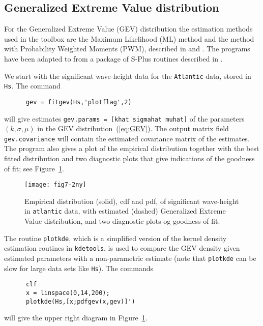 \subsection{Generalized Extreme Value distribution}

For the Generalized Extreme Value (GEV) distribution the estimation
methods used in the \progname{} toolbox are
the Maximum Likelihood (ML) method and the
method with Probability
Weighted Moments (PWM),
described in \cite{PrescottAndWalden1980Maximum} and
\cite{HoskingEtal1985Estimation}. The
programs have been adapted to \ML{} from a package of S-Plus routines
described in \cite{Borg1992XS}.

We start with the significant wave-height data for the \verb+Atlantic+ data,
stored in {\tt Hs}. The command
{\small\begin{verbatim}
      gev = fitgev(Hs,'plotflag',2)
\end{verbatim}}
\noindent
will give estimates {\tt gev.params = [khat sigmahat muhat]}
of the parameters $(k, {\sigma}, {\mu})$
in the GEV distribution~(\ref{eq:GEV}).
The output matrix field {\tt gev.covariance} will contain the
estimated covariance matrix of the estimates. The program also gives
a plot of the empirical distribution together with the
best fitted distribution and two diagnostic plots that give indications
of the goodness of fit; see Figure~\ref{fig7-2}.

 \begin{figure}
\centerline{
  \texttt{[image: fig7-2ny]}
}
\vspace{-3mm}
  \caption[Observed and estimated distribution
of significant wave-height]{
Empirical distribution (solid), cdf and pdf,
of significant wave-height in {\tt atlantic} data, with estimated (dashed)
  Generalized Extreme Value distribution, and two diagnostic plots og
goodness of fit.}
  \label{fig7-2}
\end{figure}

The routine 
{\tt plotkde}, which is a simplified version of the kernel density
estimation routines in {\tt kdetools}, is used to compare the GEV
density given estimated parameters with a non-parametric estimate
(note that {\tt plotkde} can be slow for large data sets like
{\tt Hs}).
The commands
{\small\begin{verbatim}
      clf
      x = linspace(0,14,200);
      plotkde(Hs,[x;pdfgev(x,gev)]')
\end{verbatim}}
\noindent
will give the upper right diagram in Figure~\ref{fig7-2}.

